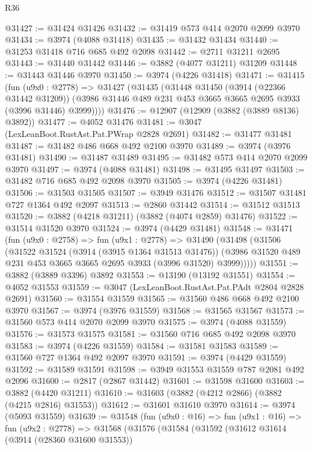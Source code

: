 \begin{lexlean}{R36}
\begin{coremodule}
@31427 := @31424 @31426
@31432 := @31419 @573 @414 @2070 @2099 @3970
@31434 := @3974 (@4088 @31418)
@31435 := @31432 @31434
@31440 := @31253 @31418 @716 @685 @492 @2098
@31442 := @2711 @31211 @2695
@31443 := @31440 @31442
@31446 := @3882 (@4077 @31211) @31209
@31448 := @31443 @31446 @3970
@31450 := @3974 (@4226 @31418)
@31471 := @31415
    (fun (u9x0 : @2778) =>
    @31427
      (@31435
        (@31448
          @31450
          (@3914 (@22366 @31442 @31209))
          (@3986 @31446 @489 @231 @453 @3665 @3665 @2695 @3933 (@3996 @31446) @3999))))
@31476 := @12907 (@12909 (@3882 (@3889 @8136) @3892))
@31477 := @4052 @31476
@31481 := @3047 (LexLeanBoot.RustAst.Pat.PWrap @2828 @2691)
@31482 := @31477 @31481
@31487 := @31482 @486 @668 @492 @2100 @3970
@31489 := @3974 (@3976 @31481)
@31490 := @31487 @31489
@31495 := @31482 @573 @414 @2070 @2099 @3970
@31497 := @3974 (@4088 @31481)
@31498 := @31495 @31497
@31503 := @31482 @716 @685 @492 @2098 @3970
@31505 := @3974 (@4226 @31481)
@31506 := @31503 @31505
@31507 := @3949 @31476
@31512 := @31507 @31481 @727 @1364 @492 @2097
@31513 := @2860 @31442
@31514 := @31512 @31513
@31520 := @3882 (@4218 @31211) (@3882 (@4074 @2859) @31476)
@31522 := @31514 @31520 @3970
@31524 := @3974 (@4429 @31481)
@31548 := @31471
    (fun (u9x0 : @2758) =>
    fun (u9x1 : @2778) =>
    @31490
      (@31498
        (@31506
          (@31522
            @31524
            (@3914 (@3915 @1364 @31513 @31476))
            (@3986 @31520 @489 @231 @453 @3665 @3665 @2695 @3933 (@3996 @31520) @3999)))))
@31551 := @3882 (@3889 @3396) @3892
@31553 := @13190 (@13192 @31551)
@31554 := @4052 @31553
@31559 := @3047 (LexLeanBoot.RustAst.Pat.PAdt @2804 @2828 @2691)
@31560 := @31554 @31559
@31565 := @31560 @486 @668 @492 @2100 @3970
@31567 := @3974 (@3976 @31559)
@31568 := @31565 @31567
@31573 := @31560 @573 @414 @2070 @2099 @3970
@31575 := @3974 (@4088 @31559)
@31576 := @31573 @31575
@31581 := @31560 @716 @685 @492 @2098 @3970
@31583 := @3974 (@4226 @31559)
@31584 := @31581 @31583
@31589 := @31560 @727 @1364 @492 @2097 @3970
@31591 := @3974 (@4429 @31559)
@31592 := @31589 @31591
@31598 := @3949 @31553 @31559 @787 @2081 @492 @2096
@31600 := @2817 (@2867 @31442)
@31601 := @31598 @31600
@31603 := @3882 (@4420 @31211)
@31610 := @31603 (@3882 (@4212 @2866) (@3882 (@4215 @2816) @31553))
@31612 := @31601 @31610 @3970
@31614 := @3974 (@5093 @31559)
@31639 := @31548
    (fun (u9x0 : @16) =>
    fun (u9x1 : @16) =>
    fun (u9x2 : @2778) =>
    @31568
      (@31576
        (@31584
          (@31592
            (@31612
              @31614
              (@3914 (@28360 @31600 @31553))

\end{coremodule}
\end{lexlean}

